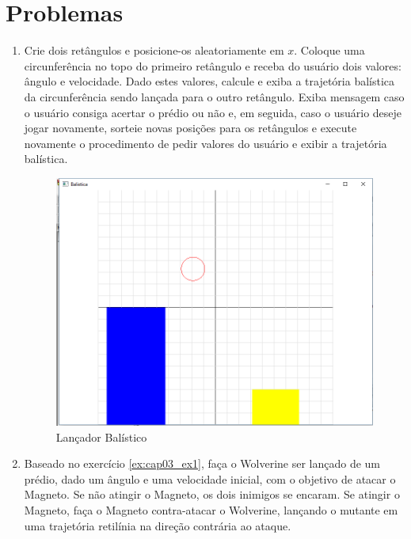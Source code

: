 \section*{Problemas}
\begin{enumerate}
\item
  Crie dois retângulos e posicione-os aleatoriamente em $x$. Coloque uma circunferência no topo do primeiro retângulo e receba do usuário dois valores: ângulo e velocidade. Dado estes valores, calcule e exiba a trajetória balística da circunferência sendo lançada para o outro retângulo. Exiba mensagem caso o usuário consiga acertar o prédio ou não e, em seguida, caso o usuário deseje jogar novamente, sorteie novas posições para os retângulos e execute novamente o procedimento de pedir valores do usuário e exibir a trajetória balística.

  \begin{figure}[ht]
    \centerline{\includegraphics[width=.5\textwidth]{img/cap3_ex12.png}}
    \caption{Lançador Balístico}
    \label{fig:cap03_ex2}
  \end{figure}

  \label{ex:cap03_ex1}

  \item
  Baseado no exercício \ref{ex:cap03_ex1}, faça o Wolverine ser lançado de um prédio, dado um ângulo e uma velocidade inicial, com o objetivo de atacar o Magneto. Se não atingir o Magneto, os dois inimigos se encaram. Se atingir o Magneto, faça o Magneto contra-atacar o Wolverine, lançando o mutante em uma trajetória retilínia na direção contrária ao ataque.


\end{enumerate}
